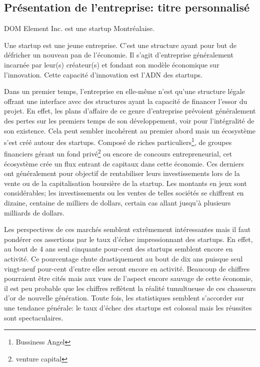 \documentclass[11pt, a4paper ]{article}
\let\stdsection\section
\renewcommand\section{\newpage\stdsection}
\begin{document}
\begin{spacing}{1.5}
	\section{Présentation de l'entreprise: titre personnalisé} %

DOM Element Inc. est une startup Montréalaise.

Une startup\cite{theseStartup} est une jeune entreprise. C'est une structure ayant pour but de défricher un nouveau pan de l'économie. Il s'agit d'entreprise généralement incarnée par leur(s) créateur(s) et fondant son modèle économique sur l'innovation. Cette capacité d'innovation est l'ADN des startups.

Dans un premier temps, l'entreprise en elle-même n'est qu'une structure légale offrant une interface avec des structures ayant la capacité de financer l’essor du projet. En effet, les plans d'affaire de ce genre d'entreprise prévoient généralement des pertes sur les premiers temps de son développement, voir pour l'intégralité de son existence. Cela peut sembler incohérent au premier abord mais un écosystème s'est créé autour des startups. Composé de riches particuliers\footnote{Bussiness Angel}, de groupes financiers gérant un fond privé\footnote{venture capital} ou encore de concours entrepreneurial, cet écosystème crée un flux entrant de capitaux dans cette économie. Ces derniers ont généralement pour objectif de rentabiliser leurs investissements lors de la vente ou de la capitalisation boursière de la startup. Les montants en jeux sont considérables; les investissements ou les ventes de telles sociétés se chiffrent en dizaine, centaine de milliers de dollars, certain cas allant jusqu'à plusieurs milliards de dollars.

Les perspectives de ces marchés semblent extrêmement intéressantes mais il faut pondérer ces assertions par le taux d'échec impressionnant des startups. En effet, au bout de 4 ans seul cinquante pour-cent des startups semblent encore en activité. Ce pourcentage chute drastiquement au bout de dix ans puisque seul vingt-neuf pour-cent d'entre elles seront encore en activité.
Beaucoup de chiffres pourraient être cités mais aux vues de l'aspect encore sauvage de cette économie, il est peu probable que les chiffres reflètent la réalité tumultueuse de ces chasseurs d'or de nouvelle génération.
Toute fois, les statistiques semblent s'accorder sur une tendance générale: le taux d'échec des startups est colossal mais les réussites sont spectaculaires.


\end{spacing}
\end{document}
